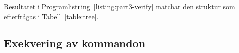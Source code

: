 Resultatet i Programlistning~\ref{listing:part3-verify} matchar den
struktur som efterfrågas i Tabell~\ref{table:tree}.



\subsection{Exekvering av kommandon}
%
%
%


